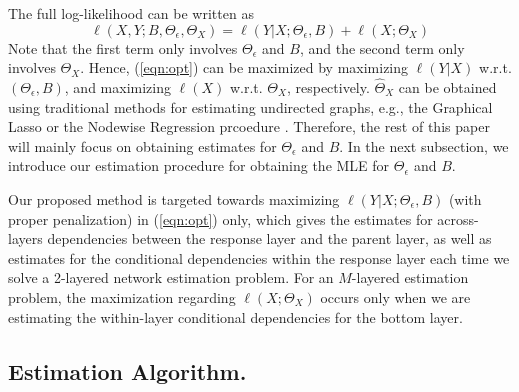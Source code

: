 The full log-likelihood can be written as 
\begin{equation}\label{eqn:opt}
\ell(X,Y;B,\Theta_\epsilon,\Theta_X) = \ell(Y|X;\Theta_\epsilon,B) + \ell(X;\Theta_X)
\end{equation}
Note that the first term only involves $\Theta_\epsilon$ and $B$, and the second term only involves $\Theta_X$. Hence, (\ref{eqn:opt}) can be maximized by maximizing $\ell(Y|X)$ w.r.t. $(\Theta_\epsilon,B)$, and maximizing $\ell(X)$ w.r.t. $\Theta_X$, respectively. $\widehat{\Theta}_X$ can be obtained using traditional methods for estimating undirected graphs, e.g., the Graphical Lasso \citep{friedman2008sparse} or the Nodewise Regression prcoedure \citep{meinshausen2006high}. Therefore, the rest of this paper will mainly focus on obtaining estimates for $\Theta_\epsilon$ and $B$. In the next subsection, we introduce our estimation procedure for obtaining the MLE for $\Theta_\epsilon$ and 
$B$.

\noindent
\begin{remark}
Our proposed method is targeted towards maximizing $\ell(Y|X;\Theta_\epsilon,B)$ (with proper penalization) in (\ref{eqn:opt}) only, which gives the estimates for across-layers dependencies between the response layer and the parent layer, as well as estimates for the conditional dependencies within the response layer each time we solve a 2-layered network estimation problem. For an $M$-layered estimation problem, the maximization regarding $\ell(X;\Theta_X)$ occurs only when we are estimating the within-layer conditional dependencies for the bottom layer.  
\end{remark}
%
%

\subsection{\normalsize Estimation Algorithm.}\label{sec:estimation}

